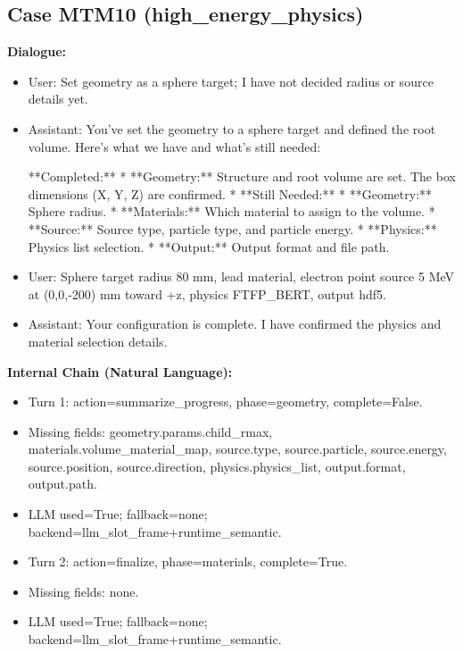 \documentclass[11pt]{ctexart}
\begin{document}
\subsection{Case MTM10 (high\_energy\_physics)}
\textbf{Dialogue:}
\begin{itemize}
\item User: Set geometry as a sphere target; I have not decided radius or source details yet.
\item Assistant: You've set the geometry to a sphere target and defined the root volume. Here's what we have and what's still needed:

**Completed:**
*   **Geometry:** Structure and root volume are set. The box dimensions (X, Y, Z) are confirmed.
*   **Still Needed:**
    *   **Geometry:** Sphere radius.
    *   **Materials:** Which material to assign to the volume.
    *   **Source:** Source type, particle type, and particle energy.
    *   **Physics:** Physics list selection.
    *   **Output:** Output format and file path.
\item User: Sphere target radius 80 mm, lead material, electron point source 5 MeV at (0,0,-200) mm toward +z, physics FTFP\_BERT, output hdf5.
\item Assistant: Your configuration is complete. I have confirmed the physics and material selection details.
\end{itemize}
\textbf{Internal Chain (Natural Language):}
\begin{itemize}
\item Turn 1: action=summarize\_progress, phase=geometry, complete=False.
\item Missing fields: geometry.params.child\_rmax, materials.volume\_material\_map, source.type, source.particle, source.energy, source.position, source.direction, physics.physics\_list, output.format, output.path.
\item LLM used=True; fallback=none; backend=llm\_slot\_frame+runtime\_semantic.
\item Turn 2: action=finalize, phase=materials, complete=True.
\item Missing fields: none.
\item LLM used=True; fallback=none; backend=llm\_slot\_frame+runtime\_semantic.
\end{itemize}
\end{document}

